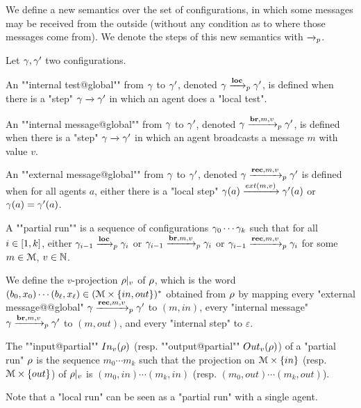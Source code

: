 We define a new semantics over the set of configurations, in which some messages may be received from the outside (without any condition as to where those messages come from). We denote the steps of this new semantics with $\xrightarrow{}_{p}$.  
\begin{definition}
	Let $\gamma, \gamma'$ two configurations. 

	An ""internal test@global"" from $\gamma$ to $\gamma'$, denoted $\gamma \xrightarrow{\textbf{loc}}_{p} \gamma'$, is defined when there is a "step" $\gamma \xrightarrow{} \gamma'$ in which an agent does a "local test". 
	
	An ""internal message@global"" from $\gamma$ to $\gamma'$, denoted $\gamma \xrightarrow{\textbf{br}, m, v}_{p} \gamma'$, is defined when there is a "step" $\gamma \xrightarrow{} \gamma'$ in which an agent broadcasts a message $m$ with value $v$. 
	
	An ""external message@global"" from $\gamma$ to $\gamma'$, denoted $\gamma \xrightarrow{\textbf{rec}, m, v}_{p} \gamma'$ is defined when for all agents $a$, either there is a "local step" $\config(a) \extbr{m}{v} \config'(a)$ or $\gamma(a) = \gamma'(a)$.
	
	A ""partial run"" is a sequence of configurations $\gamma_0 \cdots \gamma_k$  such that for all $i \in [1,k]$, either $\gamma_{i-1} \xrightarrow{\textbf{loc}}_{p} \gamma_{i}$ or $\gamma_{i-1} \xrightarrow{\textbf{br}, m, v}_{p} \gamma_{i}$ or $\gamma_{i-1} \xrightarrow{\textbf{rec}, m, v}_{p} \gamma_{i}$ for some $m \in \mathcal{M}$, $v\in \mathbb{N}$. 
	
	We define the $v$-projection ${\rho}|_{v}$ of $\rho$, which is the word $(b_0, x_0) \cdots (b_\ell, x_\ell) \in (\mathcal{M} \times \{in, out\})^*$ obtained from $\rho$ by mapping every "external message@@global" $\gamma \xrightarrow{\textbf{rec}, m, v}_{p} \gamma'$ to $(m, in)$, every "internal message" $\gamma \xrightarrow{\textbf{br}, m, v}_{p} \gamma'$ to $(m, out)$, and every "internal step" to $\varepsilon$.
	
	The ""input@partial"" $\vinput{v}{\run}$ (resp. ""output@partial"" $\voutput{v}{\run}$) of a "partial run" $\rho$ is the sequence $m_0 \cdots m_k$ such that the projection on $\mathcal{M} \times \{in\}$ (resp. $\mathcal{M}\times \{out\}$) of ${\rho}|_{v}$ is $(m_0, in) \cdots (m_k, in)$ (resp. $(m_0, out)\cdots(m_k, out)$).
	
	Note that a "local run" can be seen as a "partial run" with a single agent.
\end{definition}


